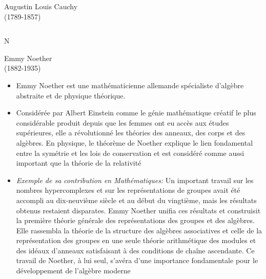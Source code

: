 \documentclass{beamer}
\begin{document}
\begin{frame}[fragile]
\begin{columns}[T]
\begin{column}{.50\textwidth}
\begin{block}{Augustin Louis Cauchy \\ (1789-1857)}
\begin{itemize}
         \end{itemize}            
       \end{block}
     \end{column}
    \end{columns}
    N\begin{block}{Emmy Noether\\(1882-1935)}
      \begin{itemize}
       \item Emmy Noether est une mathématicienne allemande spécialiste d'algèbre abstraite et de physique théorique.
       \item Considérée par Albert Einstein comme le génie mathématique créatif le plus considérable produit depuis que les femmes ont eu accès aux études supérieures, elle a révolutionné les théories des anneaux, des corps et des algèbres. En physique, le théorème de Noether explique le lien fondamental entre la symétrie et les lois de conservation et est considéré comme aussi important que la théorie de la relativité
       \item \textit{Exemple de sa contribution en Mathématiques:}  Un important travail sur les nombres hypercomplexes et sur les représentations de groupes avait été accompli au dix-neuvième siècle et au début du vingtième, mais les résultats obtenus restaient disparates. Emmy Noether unifia ces résultats et construisit la première théorie générale des représentations des groupes et des algèbres. Elle rassembla la théorie de la structure des algèbres associatives et celle de la représentation des groupes en une seule théorie arithmétique des modules et des idéaux d'anneaux satisfaisant à des conditions de chaîne ascendante. Ce travail de Noether, à lui seul, s'avéra d'une importance fondamentale pour le développement de l'algèbre moderne
      \end{itemize}
    \end{block}
  
  \end{frame}
\end{document}
